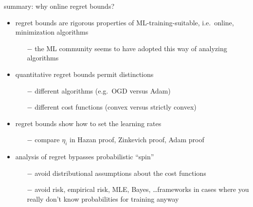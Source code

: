 \documentclass[xcolor={svgnames},
               hyperref={colorlinks,citecolor=DeepPink4,linkcolor=FireBrick,urlcolor=Maroon}]
               {beamer}
\begin{document}
\begin{frame}{\alert{summary}: why online regret bounds?}

\begin{itemize}
\item regret bounds are rigorous properties of ML-training-suitable, i.e.~online, minimization algorithms
    \begin{itemize}
    \item[$-$] the ML community seems to have adopted this way of analyzing algorithms
    \end{itemize}
\item quantitative regret bounds permit distinctions
    \begin{itemize}
    \item[$-$] different algorithms (e.g.~OGD versus Adam)
    \item[$-$] different cost functions (convex versus strictly convex)
    \end{itemize}
\item regret bounds show how to set the learning rates
    \begin{itemize}
    \item[$-$] compare $\eta_i$ in Hazan proof, Zinkevich proof, Adam proof
    \end{itemize}
\item analysis of regret bypasses probabilistic ``spin''
    \begin{itemize}
    \item[$-$] avoid distributional assumptions about the cost functions
    \item[$-$] avoid risk, empirical risk, MLE, Bayes, \dots frameworks in cases where you really don't know probabilities for training anyway
    \end{itemize}
\end{itemize}
\end{frame}
\end{document}
